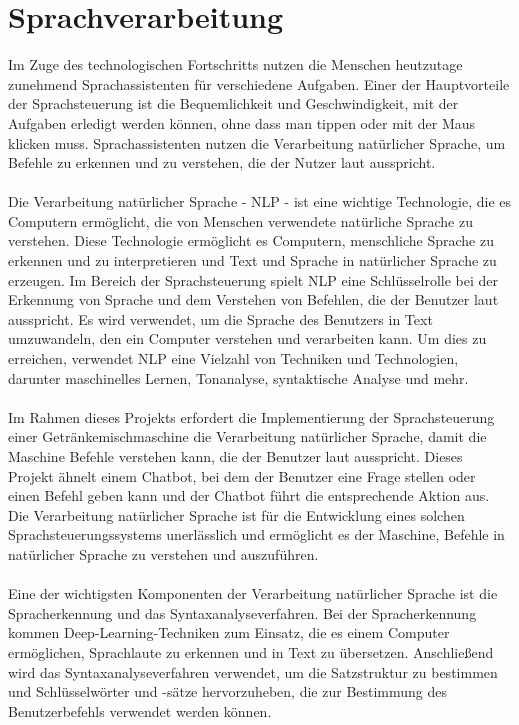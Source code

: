 \section{Sprachverarbeitung}
Im Zuge des technologischen Fortschritts nutzen die Menschen heutzutage zunehmend Sprachassistenten für verschiedene Aufgaben. 
Einer der Hauptvorteile der Sprachsteuerung ist die Bequemlichkeit und Geschwindigkeit, mit der Aufgaben erledigt werden können, ohne dass man tippen oder mit der Maus klicken muss. 
Sprachassistenten nutzen die Verarbeitung natürlicher Sprache, um Befehle zu erkennen und zu verstehen, die der Nutzer laut ausspricht.\\\\
Die Verarbeitung natürlicher Sprache - \ac{NLP} - ist eine wichtige Technologie, die es Computern ermöglicht, die von Menschen verwendete natürliche Sprache zu verstehen. 
Diese Technologie ermöglicht es Computern, menschliche Sprache zu erkennen und zu interpretieren und Text und Sprache in natürlicher Sprache zu erzeugen. 
Im Bereich der Sprachsteuerung spielt \ac{NLP} eine Schlüsselrolle bei der Erkennung von Sprache und dem Verstehen von Befehlen, die der Benutzer laut ausspricht. 
Es wird verwendet, um die Sprache des Benutzers in Text umzuwandeln, den ein Computer verstehen und verarbeiten kann.
Um dies zu erreichen, verwendet \ac{NLP} eine Vielzahl von Techniken und Technologien, darunter maschinelles Lernen, Tonanalyse, syntaktische Analyse und mehr. \cite{jurafsky_speech_2009}\\\\
Im Rahmen dieses Projekts erfordert die Implementierung der Sprachsteuerung einer Getränkemischmaschine die Verarbeitung natürlicher Sprache, damit die Maschine Befehle verstehen kann, die der Benutzer laut ausspricht. 
Dieses Projekt ähnelt einem Chatbot, bei dem der Benutzer eine Frage stellen oder einen Befehl geben kann und der Chatbot führt die entsprechende Aktion aus. 
Die Verarbeitung natürlicher Sprache ist für die Entwicklung eines solchen Sprachsteuerungssystems unerlässlich und ermöglicht es der Maschine, Befehle in natürlicher Sprache zu verstehen und auszuführen.\\\\
Eine der wichtigsten Komponenten der Verarbeitung natürlicher Sprache ist die Spracherkennung und das Syntaxanalyseverfahren. 
Bei der Spracherkennung kommen Deep-Learning-Techniken zum Einsatz, die es einem Computer ermöglichen, Sprachlaute zu erkennen und in Text zu übersetzen. 
Anschließend wird das Syntaxanalyseverfahren verwendet, um die Satzstruktur zu bestimmen und Schlüsselwörter und -sätze hervorzuheben, die zur Bestimmung des Benutzerbefehls verwendet werden können.
